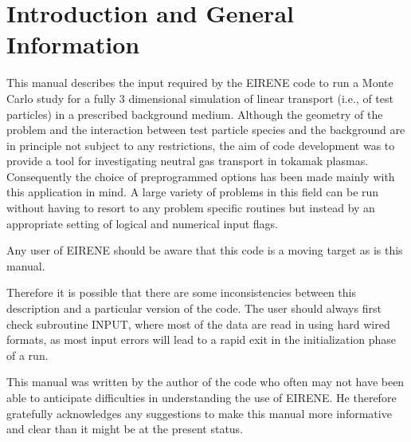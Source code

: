 \chapter{Introduction and General Information} \label{intro}

This manual describes the input required by the EIRENE code to run a Monte
Carlo study for a fully 3 dimensional simulation of linear transport (i.e., of
test particles) in a prescribed background medium.
Although the geometry of the problem and the interaction between test particle
species and the background are in principle not subject to any restrictions,
the aim of code development was to provide a tool for investigating neutral gas
transport in tokamak plasmas.
Consequently the choice of preprogrammed options has been made mainly with this
application in mind.
A large variety of problems in this field can be run without having to resort
to any problem specific routines but instead by an appropriate setting of
logical and numerical input flags.

Any user of EIRENE should be aware that this code is a moving target as is this
manual.

Therefore it is possible that there are some inconsistencies between this
description and a particular version of the code.
The user should always first check subroutine INPUT, where most of the data are
read in using hard wired formats, as most input errors will lead to a rapid
exit in the initialization phase of a run.

This manual was written by the author of the code who often may not have been
able to anticipate difficulties in understanding the use of EIRENE.
He therefore gratefully acknowledges any suggestions to make this manual more
informative and clear than it might be at the present status.

